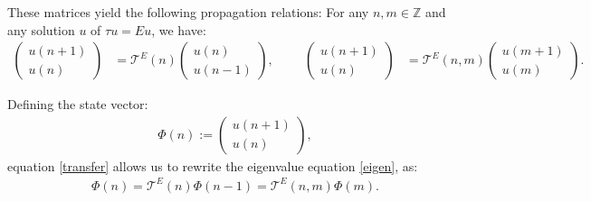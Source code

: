 \documentclass[12pt,oneside,onecolumn,open]{article}
\begin{document}
These matrices yield the following propagation relations:
For any $n, m \in \mathbb{Z}$ and any solution $u$ of $\tau u =Eu $, we have:
    \begin{align}\label{transfer}
        \begin{pmatrix} u(n+1) \\ u(n) \end{pmatrix} &=
        \mathcal{T}^{E}(n) \begin{pmatrix} u(n) \\ u(n-1) \end{pmatrix}, \hspace{1cm}
        \begin{pmatrix} u(n+1) \\ u(n) \end{pmatrix} &=
        \mathcal{T}^{E}(n, m) \begin{pmatrix} u(m+1) \\ u(m) \end{pmatrix}.
    \end{align}

  
Defining the state vector:
\begin{align}
    \Phi(n) := \begin{pmatrix} u(n+1) \\ u(n) \end{pmatrix},
\end{align}
equation \eqref{transfer} allows us to rewrite the eigenvalue equation \eqref{eigen}, as:
\begin{align}\label{rw}
    \Phi(n) = \mathcal{T}^{E}(n) \Phi(n-1) = \mathcal{T}^{E}(n, m) \Phi(m).
\end{align}
\end{document}
